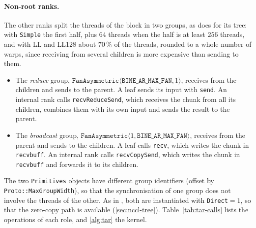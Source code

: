 \paragraph{Non-root ranks.}
The other ranks split the threads of the block in two groups, as \nccl{} does for its tree: with \texttt{Simple} the first half, plus $64$ threads when the half is at least $256$ threads, and with LL and LL128 about $70\,\%$ of the threads, rounded to a whole number of warps, since receiving from several children is more expensive than sending to them.
\begin{itemize}
  \item The \emph{reduce} group, $\texttt{FanAsymmetric}\langle\texttt{BINE\_AR\_MAX\_FAN},1\rangle$, receives from the children and sends to the parent.
  A leaf sends its input with \texttt{send}. An internal rank calls \texttt{recvReduceSend}, which receives the chunk from all its children, combines them with its own input and sends the result to the parent.
  \item The \emph{broadcast} group, $\texttt{FanAsymmetric}\langle1,\texttt{BINE\_AR\_MAX\_FAN}\rangle$, receives from the parent and sends to the children.
  A leaf calls \texttt{recv}, which writes the chunk in \texttt{recvbuff}. An internal rank calls \texttt{recvCopySend}, which writes the chunk in \texttt{recvbuff} and forwards it to its children.
\end{itemize}
The two \texttt{Primitives} objects have different group identifiers (offset by \texttt{Proto::Max\allowbreak GroupWidth}), so that the synchronisation of one group does not involve the threads of the other.
As in \nccl{}, both are instantiated with \texttt{Direct}$=1$, so that the zero-copy path is available (\cref{sec:nccl-tree}).
Table~\ref{tab:tar-calls} lists the operations of each role, and \cref{alg:tar} the kernel.
